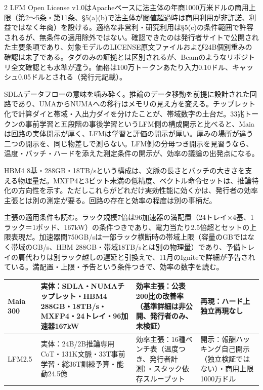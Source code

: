 \documentclass[lualatex,a4paper,10pt]{jlreq}
\begin{document}
\begin{multicols}{2}
LFM Open License v1.0はApacheベースに法主体の年商1000万米ドルの商用上限（第2〜5条・第11条、§5(a)(b)で法主体が閾値超過時は商用利用が非許諾、利益ではなく年商）を設ける。適格な非営利・研究利用は§5(c)の条件範囲で許容されるが、無条件の適用除外ではない。確認できたのは発行者サイトで公開された主要条項であり、対象モデルのLICENSE原文ファイルおよび24B個別重みの確認は未了である。タグのみの証拠とは区別されるが、Beamのようなリポジトリ全文確認とも水準が違う。価格は100万トークンあたり入力0.10ドル、キャッシュ0.05ドルとされる（発行元記載）。
\cite{B11,B69,B12}


SDLAデータフローの意味を噛み砕く。推論のデータ移動を前提に設計された回路であり、UMAからNUMAへの移行はメモリの見え方を変える。チップレット化で計算ダイと帯域・入出力ダイを分けたことが、帯域数字の土台だ。33兆トークンの事前学習と五段階の事後学習というLFM側の構成開示と比べると、Maiaは回路の実体開示が厚く、LFMは学習と評価の開示が厚い。厚みの場所が違う二つの開示を、同じ物差しで測らない。LFM側の分母つき開示を見習うなら、温度・バッチ・ハードを添えた測定条件の開示が、効率の議論の出発点になる。
\cite{B09,B66,B10,B67,B68,B11,B69,B12}


HBM4 8基・288GB・18TB/sという構成は、文脈の長さとバッチの大きさを支える物理量だ。MXFP4と3ビット未満の低精度、ベクトル命令セットは、推論特化の方向性を示す。ただしこれらがどれだけ実効性能に効くかは、発行者の効率主張とは別の測定が要る。回路の存在と効率の程度は別の事柄だ。
\cite{B09,B66,B10,B67,B68}


主張の適用条件も読む。ラック規模7倍は96加速器の満配置（24トレイ×4基、1ラック＝1ポッド、167kW）の条件つきであり、電力当たり2.5倍超とセットの上限表現だ。加速器間750GB/sは一部ラック横断時の帯域上限（容量のGBではなく帯域のGB/s、HBM 288GB・帯域18TB/sとは別の物理量）であり、予備トレイの肩代わりは別ラック越しの遅延と引換えで、11月のIgniteで詳細が予告されている。満配置・上限・予告という条件つきで、効率の数字を読む。
\cite{B09,B66,B10,B67,B68}


\end{multicols} %

{\centering\footnotesize
{}
\begin{tabularx}{0.96\linewidth}{@{}lXXX@{}}
\toprule
Maia 300 & 実体：SDLA・NUMAチップレット・HBM4 288GB・18TB/s・MXFP4・24トレイ・96加速器167kW & 効率主張：公表200比の改善率（基準詳細は非公開、発行者のみ、未検証） & 再現：ハード上独立再現なし \cite{B09,B66,B10,B67} \\
\midrule
LFM2.5 & 実体：24B/2B推論専用CoT・131K文脈・33T事前学習・総36T訓練予算・能動24.5億 & 効率主張：16種ベンチ表（温度つき、発行者計測）・スタック依存スループット & 開示：報酬ハッキング自己開示（独立検証ではない）・商用上限1000万ドル \cite{B11,B69,B12} \\
\bottomrule
\end{tabularx}
} %
\end{document}
